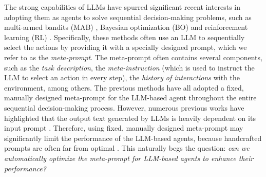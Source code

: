 The strong capabilities of LLMs have spurred significant recent interests in adopting them as agents to solve sequential decision-making problems, such as multi-armed bandits (MAB) \cite{krishnamurthy2024can}, Bayesian optimization (BO) \cite{yang2023large} and reinforcement learning (RL) \cite{dai2024context}. Specifically, these methods often use an LLM to sequentially select the actions by providing it with a specially designed prompt, which we refer to as the \emph{meta-prompt}.
The meta-prompt often contains several components, such as the \emph{task description}, the \emph{meta-instruction} (which is used to instruct the LLM to select an action in every step), the \emph{history of interactions} with the environment, among others. 
The previous methods have all adopted a fixed, manually designed meta-prompt for the LLM-based agent throughout the entire sequential decision-making process. However, numerous previous works have highlighted that the output text generated by LLMs is heavily dependent on its input prompt \cite{zhou2023large}. 
Therefore, using fixed, manually designed meta-prompt may significantly limit the performance of the LLM-based agents, because handcrafted prompts are often far from optimal \cite{lin2023instinct}. This naturally begs the question: \emph{can we automatically optimize the meta-prompt for LLM-based agents to enhance their performance?}

